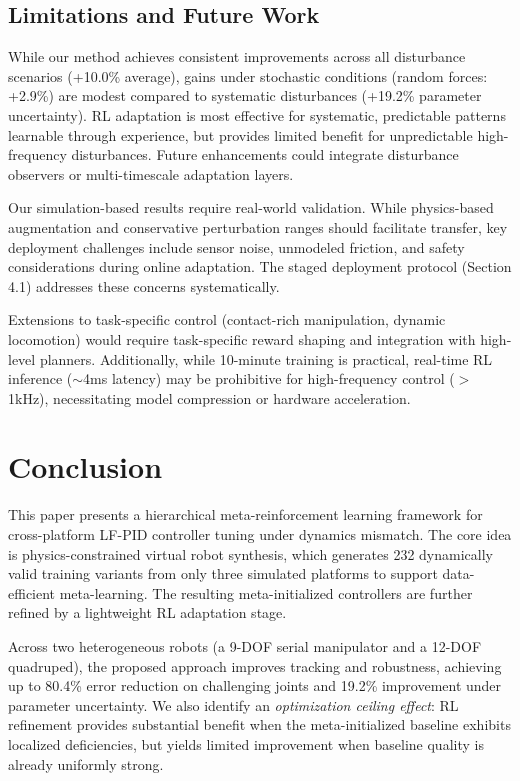 \documentclass[a4paper]{cas-sc}
\begin{document}
\subsection{Limitations and Future Work}

While our method achieves consistent improvements across all disturbance scenarios (+10.0\% average), gains under stochastic conditions (random forces: +2.9\%) are modest compared to systematic disturbances (+19.2\% parameter uncertainty). RL adaptation is most effective for systematic, predictable patterns learnable through experience, but provides limited benefit for unpredictable high-frequency disturbances. Future enhancements could integrate disturbance observers or multi-timescale adaptation layers.

Our simulation-based results require real-world validation. While physics-based augmentation and conservative perturbation ranges should facilitate transfer, key deployment challenges include sensor noise, unmodeled friction, and safety considerations during online adaptation. The staged deployment protocol (Section 4.1) addresses these concerns systematically.

Extensions to task-specific control (contact-rich manipulation, dynamic locomotion) would require task-specific reward shaping and integration with high-level planners. Additionally, while 10-minute training is practical, real-time RL inference ($\sim$4ms latency) may be prohibitive for high-frequency control ($>$1kHz), necessitating model compression or hardware acceleration.

\section{Conclusion}
\label{sec:conclusion}

This paper presents a hierarchical meta-reinforcement learning framework for cross-platform LF-PID controller tuning under dynamics mismatch. The core idea is physics-constrained virtual robot synthesis, which generates 232 dynamically valid training variants from only three simulated platforms to support data-efficient meta-learning. The resulting meta-initialized controllers are further refined by a lightweight RL adaptation stage.

Across two heterogeneous robots (a 9-DOF serial manipulator and a 12-DOF quadruped), the proposed approach improves tracking and robustness, achieving up to 80.4\% error reduction on challenging joints and 19.2\% improvement under parameter uncertainty. We also identify an \textit{optimization ceiling effect}: RL refinement provides substantial benefit when the meta-initialized baseline exhibits localized deficiencies, but yields limited improvement when baseline quality is already uniformly strong.
\end{document}

